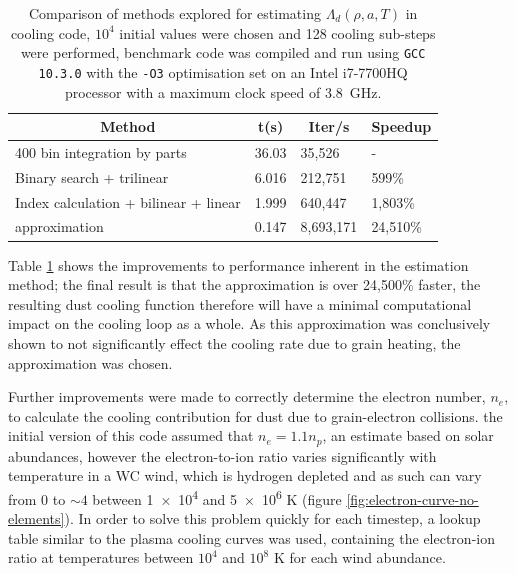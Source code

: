 \begin{table}[h]
  \centering
  \begin{tabular}{llll}
    \hline
    \multicolumn{1}{c}{\textbf{Method}} & \multicolumn{1}{c}{\textbf{t(s)}} & \multicolumn{1}{c}{\textbf{Iter/s}} & \multicolumn{1}{c}{\textbf{Speedup}} \\ \hline
    400 bin integration by parts & 36.03 & 35,526 & - \\
    Binary search + trilinear & 6.016 & 212,751 & 599\% \\
    Index calculation + bilinear + linear & 1.999 & 640,447 & 1,803\% \\
    \cite{dwek_infrared_1981} approximation & 0.147 & 8,693,171 & 24,510\% \\ \hline
  \end{tabular}
  \caption[Dust cooling calculation comparison]{Comparison of methods explored for estimating $\Lambda_d(\rho,a,T)$ in cooling code, $10^4$ initial values were chosen and 128 cooling sub-steps were performed, benchmark code was compiled and run using \texttt{GCC 10.3.0} with the \texttt{-O3} optimisation set on an Intel i7-7700HQ processor with a maximum clock speed of \SI{3.8}{\giga\hertz}.}
  \label{tab:electron-speedup}
\end{table}

Table \ref{tab:electron-speedup} shows the improvements to performance inherent in the estimation method; the final result is that the approximation is over 24,500\% faster, the resulting dust cooling function therefore will have a minimal computational impact on the cooling loop as a whole.
As this approximation was conclusively shown to not significantly effect the cooling rate due to grain heating, the approximation was chosen.

Further improvements were made to correctly determine the electron number, $n_e$, to calculate the cooling contribution for dust due to grain-electron collisions.
the initial version of this code assumed that $n_e = 1.1 n_p$, an estimate based on solar abundances, however the electron-to-ion ratio varies significantly with temperature in a WC wind, which is hydrogen depleted and as such can vary from 0 to $\sim 4$ between \num{1e4} and \num{5e6} \si{\kelvin} (figure \ref{fig:electron-curve-no-elements}).
In order to solve this problem quickly for each timestep, a lookup table similar to the plasma cooling curves was used, containing the electron-ion ratio at temperatures between $10^4$ and $10^8$ \si{\kelvin} for each wind abundance.

